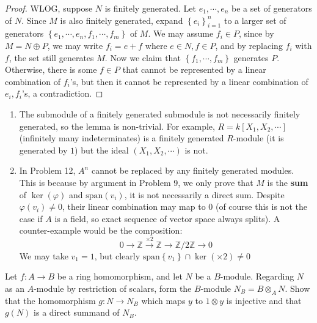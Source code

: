 \documentclass{solution}
\begin{document}
\begin{proof}
    WLOG, suppose $N$ is finitely generated. Let $e_1, \cdots, e_n$ be a set of generators of $N$. Since $M$ is also finitely generated, expand $\left\lbrace e_i \right\rbrace_{i = 1}^n$ to a larger set of generators $\left\lbrace e_1, \cdots, e_n, f_1, \cdots, f_m \right\rbrace$ of $M$. We may assume $f_i \in P$, since by $M = N \oplus P$, we may write $f_i = e + f$ where $e \in N, f \in P$, and by replacing $f_i$ with $f$, the set still generates $M$. Now we claim that $\left\lbrace f_1, \cdots, f_m \right\rbrace$ generates $P$. Otherwise, there is some $f \in P$ that cannot be represented by a linear combination of $f_i$'s, but then it cannot be represented by a linear combination of $e_i, f_i$'s, a contradiction.
\end{proof}

{\color{red}
\begin{remark}
    \begin{enumerate}
        \item The submodule of a finitely generated submodule is not necessarily finitely generated, so the lemma is non-trivial. For example, $R = k[X_1, X_2, \cdots]$ (infinitely many indeterminates) is a finitely generated $R$-module (it is generated by $1$) but the ideal $(X_1, X_2, \cdots)$ is not.
        \item In Problem 12, $A^n$ cannot be replaced by any finitely generated modules. This is because by argument in Problem 9, we only prove that $M$ is the \textbf{sum} of $\ker(\varphi)$ and $\mathrm{span}(v_i)$, it is not necessarily a direct sum. Despite $\varphi(v_i) \ne 0$, their linear combination may map to $0$ (of course this is not the case if $A$ is a field, so exact sequence of vector space always splits). A counter-example would be the composition:
        $$0 \rightarrow \mathbb{Z} \xrightarrow{\times 2} \mathbb{Z} \rightarrow \mathbb{Z} / 2 \mathbb{Z} \rightarrow 0$$
        We may take $v_1 = 1$, but clearly $\mathrm{span} \left\lbrace v_1 \right\rbrace \cap \ker (\times 2) \ne 0$
    \end{enumerate}
\end{remark}
}

\begin{problem}
    Let $f: A \rightarrow B$ be a ring homomorphism, and let $N$ be a $B$-module. Regarding $N$ as an $A$-module by restriction of scalars, form the $B$-module $N_B = B \otimes_A N$. Show that the homomorphism $g: N \rightarrow N_B$ which maps $y$ to $1 \otimes y$ is injective and that $g(N)$ is a direct summand of $N_B$.
\end{problem}
\end{document}
